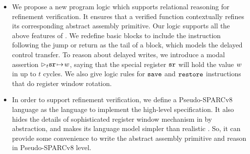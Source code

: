 
\begin{itemize}
    \item
    We propose a new program logic which supports relational reasoning for
    refinement verification.
    It ensures that a verified \sparc{} function
    contextually refines its corresponding
    abstract assembly primitive.
%
    Our logic supports all the above features of \sparc.
    We redefine basic blocks to include the instruction
    following the jump or return as the tail of a
    block, which models the delayed control
    transfer. To reason about delayed writes, we introduce
    a modal assertion $\rhd_{t}{\texttt{sr}} \!\mapsto\! {w}$, saying that
    the special register $\texttt{sr}$ will
    hold the value $w$ in up to $t$ cycles.
    We also give
    logic rules for $\texttt{save}$ and $\texttt{restore}$ instructions
    that do register window rotation.
%
%
    \item
    In order to support refinement verification, we define a
    Pseudo-SPARCv8 language as the language to implement
    the high-level specification.
    It also hides the details of
    sophisticated register window mechanism
    in \sparc{} by abstraction,
    and makes its language model
    simpler than realistic \sparc{}.
    So, it can provide some convenience
    to write the abstract assembly primitive
    and reason in Pseudo-SPARCv8 level.


\end{itemize}
